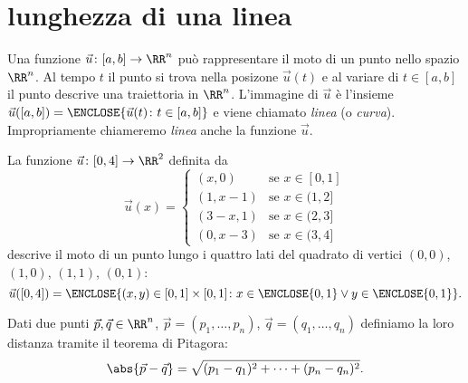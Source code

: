     \section{lunghezza di una linea}
    
    Una funzione $\vec u\colon [a,b]\to \RR^n$ può rappresentare 
    il moto di un punto nello spazio $\RR^n$. 
    Al tempo $t$ il punto si trova nella posizone $\vec u(t)$
    e al variare di $t\in [a,b]$ il punto descrive una traiettoria in $\RR^n$.
    L'immagine di $\vec u$ è l'insieme $\vec u([a,b]) =\ENCLOSE{\vec u(t)\colon t\in[a,b]}$
    e viene chiamato \emph{linea} (o \emph{curva}).
    Impropriamente chiameremo \emph{linea} anche la funzione $\vec u$.
     
    \begin{example}[quadrato]
    La funzione $\vec u \colon [0,4]\to \RR^2$ definita da 
    \[
    \vec u(x) = \begin{cases} 
         (x,0) & \text{se $x\in [0,1]$} \\
         (1,x-1) & \text{se $x\in (1,2]$} \\
         (3-x,1) & \text{se $x\in (2,3]$} \\
         (0,x-3) & \text{se $x\in (3,4]$}
    \end{cases}
    \]
    descrive il moto di un punto lungo i quattro lati 
    del quadrato di vertici $(0,0)$, $(1,0)$, $(1,1)$, $(0,1)$:
    \[
     \vec u([0,4]) = \ENCLOSE{(x,y)\in[0,1]\times[0,1]\colon 
     x\in\ENCLOSE{0,1} \lor y \in \ENCLOSE{0,1}}.  
    \]
    \end{example}
    
    Dati due punti $\vec p, \vec q \in \RR^n$,
    $\vec p = (p_1,\dots, p_n)$, $\vec q=(q_1,\dots,q_n)$  
    definiamo la loro distanza tramite il teorema di Pitagora:
    \[
     \abs{\vec p - \vec q} = \sqrt{(p_1-q_1)^2 + \dots + (p_n-q_n)^2}.  
    \]
    
